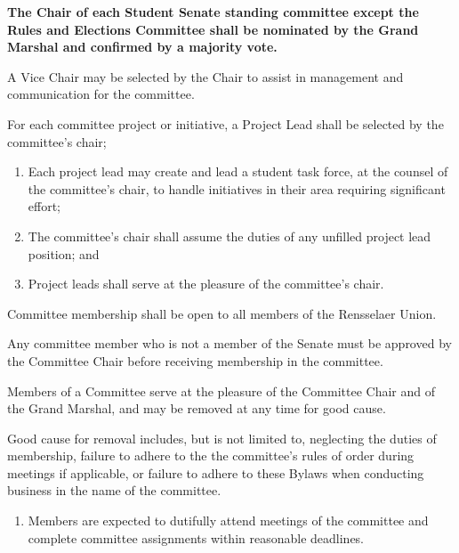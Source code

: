 \begin{enumerate}

    \item \textbf{The Chair of each Student Senate standing committee except the Rules and Elections Committee shall be nominated by the Grand Marshal and confirmed by a majority vote.}
    \begin{enumerate}
        \item A Vice Chair may be selected by the Chair to assist in management and communication for the committee.

        { \bf \item For each committee project or initiative, a Project Lead shall be selected by the committee's chair;
        \begin{enumerate}
            \item Each project lead may create and lead a student task force, at the counsel of the committee's chair, to handle initiatives in their area requiring significant effort;

            \item The committee's chair shall assume the duties of any unfilled project lead position; and

            \item Project leads shall serve at the pleasure of the committee's chair.
        \end{enumerate} }
    \end{enumerate}

    \item Committee membership shall be open to all members of the Rensselaer Union.
    \begin{enumerate}
        \item Any committee member who is not a member of the Senate must be approved by the Committee Chair before receiving
        membership in the committee.

        \item Members of a Committee serve at the pleasure of the Committee Chair and of the Grand Marshal, and may be removed at
        any time for good cause.

        { \bf \item Good cause for removal includes, but is not limited to, neglecting the duties of membership, failure to adhere to the the committee's rules of order during meetings if applicable, or failure to adhere to these Bylaws when conducting business in the name of the committee. }
        \begin{enumerate}
            \item Members are expected to dutifully attend meetings of the committee and complete committee assignments within reasonable deadlines.
        \end{enumerate}
    \end{enumerate}


\end{enumerate}
